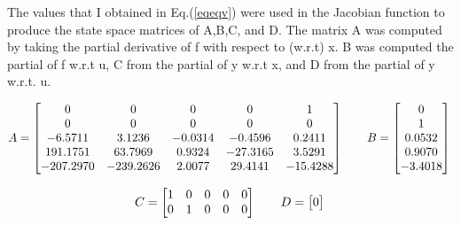 \documentclass[12pt]{article}
\begin{document}
The values that I obtained in Eq.(\eqref{eqeqv}) were used in the Jacobian function to produce the state space matrices of A,B,C, and D. The matrix A was computed by taking the partial derivative of f with respect to (w.r.t) x. B was computed the partial of f w.r.t u, C from the partial of y w.r.t x, and D from the partial of y w.r.t. u.

\begin{equation*}
   A = \begin{bmatrix}
    0 & 0 & 0 & 0 & 1\\
    0 & 0 & 0 & 0 & 0\\
    -6.5711 & 3.1236 & -0.0314 & -0.4596 & 0.2411\\
    191.1751 &  63.7969& 0.9324 & -27.3165 & 3.5291\\ -207.2970 & -239.2626 & 2.0077 & 29.4141 & -15.4288\\
    \end{bmatrix} \qquad B = \begin{bmatrix}
    0\\ 1\\ 0.0532\\ 0.9070\\ -3.4018\\
    \end{bmatrix}\\ 
\end{equation*}

\begin{equation*}
    C = \begin{bmatrix}
    1 & 0 & 0 & 0 & 0\\ 0 & 1 & 0 & 0 & 0\\
    \end{bmatrix} \qquad D = \begin{bmatrix}
    0
    \end{bmatrix}\\
\end{equation*}
\end{document}
